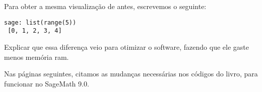 \documentclass[10pt,a4paper]{report}
\begin{document}
Para obter a mesma visualização de antes, escrevemos o seguinte:

\begin{lstlisting}[frame=e, numbers=none, xleftmargin=0em]
sage: list(range(5))
 [0, 1, 2, 3, 4] 
\end{lstlisting}



Explicar que essa diferença veio para otimizar o software, fazendo que ele gaste menos memória ram.


Nas páginas seguintes, citamos as mudanças necessárias nos códigos do livro, para funcionar no SageMath 9.0.

\newpage


% 
% 
% 
% 
% 
% 
%  
%  
\end{document}
